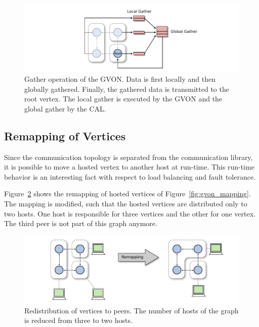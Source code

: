 \begin{figure}[H]
  \centering \includegraphics[width=\textwidth]{graphics/30_gvon_collective}
  \caption{Gather operation of the GVON. Data is first locally and
    then globally gathered. Finally, the gathered data is transmitted
    to the root vertex. The local gather is executed by the GVON and
    the global gather by the CAL.}
  \label{fig:gvon_collective}
\end{figure}


\subsection{Remapping of Vertices}
\label{sec:remapping}
Since the communication topology is separated from the communication
library, it is possible to move a hosted vertex to another host at
run-time.  This run-time behavior is an interesting fact with respect
to load balancing and fault tolerance.


Figure~\ref{fig:gvon_remapping} shows the remapping of
hosted vertices of Figure~\ref{fig:gvon_mapping}. The mapping is modified, such that the
hosted vertices are distributed only to two hosts. One host is responsible for three
vertices and the other for one vertex. The third peer is not part of this
graph anymore.

\begin{figure}[H]
  \centering
  \includegraphics[width=\textwidth]{graphics/30_gvon_remapping}
  \caption{Redistribution of vertices to peers. The number of hosts of
    the graph is reduced from three to two hosts.}
  \label{fig:gvon_remapping}
\end{figure}

